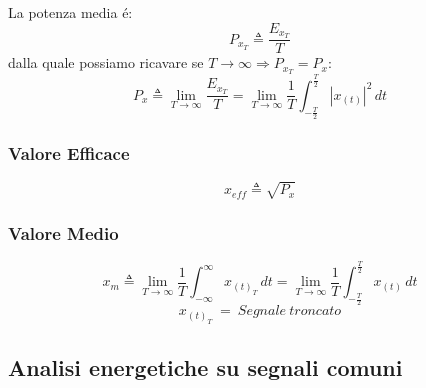             La potenza media é:
            \[
                P_{x_{T}} \triangleq \frac{E_{x_{T}}}{T}    
            \]
            dalla quale possiamo ricavare se $T \rightarrow \infty \Rightarrow P_{x_{T}} = P_{x}$:
            \[
                P_{x} \triangleq \lim_{T\rightarrow\infty} \frac{E_{x_{T}}}{T} =\lim_{T\rightarrow\infty} \frac{1}{T} \int_{-\frac{T}{2}}^{\frac{T}{2}}  |x_{(t)}|^2 \,dt    
            \]  
        \subsubsection{Valore Efficace}
                \[    
                    x_{eff} \triangleq \sqrt{P_{x}}
                \]
        
        \subsubsection{Valore Medio}

                    \[
                        x_{m} \triangleq \lim_{T\rightarrow\infty} \frac{1}{T} \int_{-\infty}^{\infty}  x_{(t)_T} \,dt = \lim_{T\rightarrow\infty} \frac{1}{T} \int_{-\frac{T}{2}}^{\frac{T}{2}}  x_{(t)} \,dt 
                    \]
                    \[
                        x_{(t)_T}\ =\ Segnale\ troncato
                    \]
                    
    \subsection{Analisi energetiche su segnali comuni}
